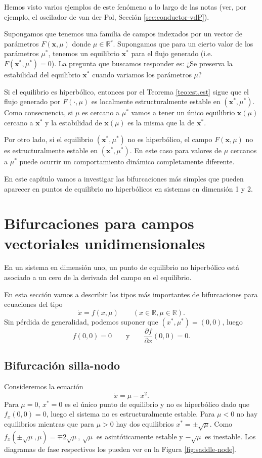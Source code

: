 \documentclass[12pt, a4paper]{amsbook}
\newcommand{\R}{{\mathbb R}}
\newcommand{\xx}{{\mathbf x}}
\theoremstyle{remark}
\theoremstyle{definition}
\numberwithin{section}{chapter}
\numberwithin{subsection}{section}
\numberwithin{equation}{section}
\numberwithin{figure}{chapter}
\begin{document}
Hemos visto varios ejemplos de este fenómeno a lo largo de las notas (ver, por ejemplo, el oscilador de van der Pol, Sección \ref{sec:conductor-vdP}).

Supongamos que tenemos una familia de campos indexados por un vector de parámetros $F(\xx, \mu)$ donde $\mu\in\R^r$. Supongamos que para un cierto valor de los parámetros $\mu^*$, tenemos un equilibrio $\xx^*$ para el flujo generado (i.e. $F(\xx^*, \mu^*)=0$). La pregunta que buscamos responder es: ¿Se preserva la estabilidad del equilibrio $\xx^*$ cuando variamos los parámetros $\mu$?

Si el equilibrio es hiperbólico, entonces por el Teorema \ref{teo:est.est} sigue que el flujo generado por $F(\cdot,\mu)$ es localmente estructuralmente estable en $(\xx^*,\mu^*)$. Como consecuencia, si $\mu$ es cercano a $\mu^*$ vamos a tener un único equilibrio $\xx(\mu)$ cercano a $\xx^*$ y la estabilidad de $\xx(\mu)$ es la misma que la de $\xx^*$.

Por otro lado, si el equilibrio $(\xx^*,\mu^*)$ no es hiperbólico, el campo $F(\xx, \mu)$ no es estructuralmente estable en $(\xx^*,\mu^*)$. En este caso para valores de $\mu$ cercanos a $\mu^*$ puede ocurrir un comportamiento dinámico completamente diferente.

En este capítulo vamos a investigar las bifurcaciones más simples que pueden aparecer en puntos de equilibrio no hiperbólicos en sistemas en dimensión 1 y 2.

\section{Bifurcaciones para campos vectoriales unidimensionales}

En un sistema en dimensión uno, un punto de equilibrio no hiperbólico está asociado a un cero de la derivada del campo en el equilibrio. 

En esta sección vamos a describir los tipos más importantes de bifurcaciones para ecuaciones del tipo
$$
\dot x = f(x,\mu)\qquad (x\in\R, \mu\in\R).
$$
Sin pérdida de generalidad, podemos suponer que $(x^*,\mu^*)=(0,0)$, luego
$$
f(0,0)=0\qquad \text{y}\qquad \frac{\partial f}{\partial x}(0,0)=0.
$$

\subsection*{Bifurcación silla-nodo}

Consideremos la ecuación
\begin{equation}\label{eq:saddle-node}
\dot x = \mu - x^2.
\end{equation}
Para $\mu=0$, $x^*=0$ es el único punto de equilibrio y no es hiperbólico dado que $f_x(0,0)=0$, luego el sistema no es estructuralmente estable. Para $\mu<0$ no hay equilibrios mientras que para $\mu>0$ hay dos equilibrios $x^*=\pm\sqrt{\mu}$. Como $f_x(\pm\sqrt{\mu}, \mu) = \mp2\sqrt{\mu}$, $\sqrt{\mu}$ es asintóticamente estable y $-\sqrt{\mu}$ es inestable. Los diagramas de fase respectivos los pueden ver en la Figura \ref{fig:saddle-node}.
\end{document}
